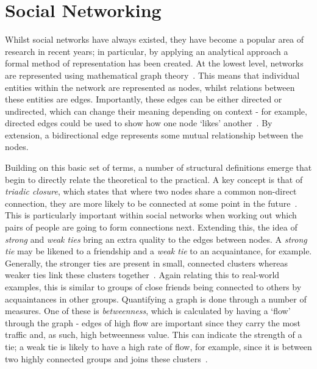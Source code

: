 \documentclass[]{report}
\begin{document}
\section{Social Networking}
\label{sec:litrev-socnet}
Whilst social networks have always existed, they have become a popular area of research in recent years; in particular, by applying an analytical approach a formal method of representation has been created. At the lowest level, networks are represented using mathematical graph theory~\cite{NetMark-21}. This means that individual entities within the network are represented as nodes, whilst relations between these entities are edges. Importantly, these edges can be either directed or undirected, which can change their meaning depending on context - for example, directed edges could be used to show how one node `likes' another~\cite{USN-14}. By extension, a bidirectional edge represents some mutual relationship between the nodes.

Building on this basic set of terms, a number of structural definitions emerge that begin to directly relate the theoretical to the practical. A key concept is that of \emph{triadic closure}, which states that where two nodes share a common non-direct connection, they are more likely to be connected at some point in the future~\cite{NetMark-44}. This is particularly important within social networks when working out which pairs of people are going to form connections next. Extending this, the idea of \emph{strong} and \emph{weak ties} bring an extra quality to the edges between nodes. A \emph{strong tie} may be likened to a friendship and a \emph{weak tie} to an acquaintance, for example. Generally, the stronger ties are present in small, connected clusters whereas weaker ties link these clusters together~\cite{NetMark-46}. Again relating this to real-world examples, this is similar to groups of close friends being connected to others by acquaintances in other groups. Quantifying a graph is done through a number of measures. One of these is \emph{betweenness}, which is calculated by having a `flow' through the graph - edges of high flow are important since they carry the most traffic and, as such, high betweenness value. This can indicate the strength of a tie; a weak tie is likely to have a high rate of flow, for example, since it is between two highly connected groups and joins these clusters~\cite{NetMark-66}.  
\end{document}
